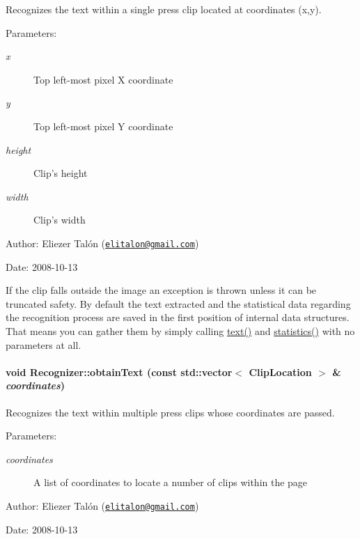 Recognizes the text within a single press clip located at coordinates (x,y). 

\begin{Desc}
\item[Parameters:]
\begin{description}
\item[{\em x}]Top left-most pixel X coordinate \item[{\em y}]Top left-most pixel Y coordinate \item[{\em height}]Clip's height \item[{\em width}]Clip's width\end{description}
\end{Desc}
\begin{Desc}
\item[Author:]Eliezer Talón (\href{mailto:elitalon@gmail.com}{\tt elitalon@gmail.com}) \end{Desc}
\begin{Desc}
\item[Date:]2008-10-13\end{Desc}
If the clip falls outside the image an exception is thrown unless it can be truncated safety. By default the text extracted and the statistical data regarding the recognition process are saved in the first position of internal data structures. That means you can gather them by simply calling \hyperlink{class_recognizer_c5d20b511888a60a6c1a81c0a4206ec2}{text()} and \hyperlink{class_recognizer_8b38356d2741969e67cd6b4f507897ba}{statistics()} with no parameters at all. \hypertarget{class_recognizer_4b3b27b3746edcf831d142eddfb81f19}{
\paragraph[{obtainText}]{\setlength{\rightskip}{0pt plus 5cm}void Recognizer::obtainText (const std::vector$<$ {\bf ClipLocation} $>$ \& {\em coordinates})}\hfill}
\label{class_recognizer_4b3b27b3746edcf831d142eddfb81f19}


Recognizes the text within multiple press clips whose coordinates are passed. 

\begin{Desc}
\item[Parameters:]
\begin{description}
\item[{\em coordinates}]A list of coordinates to locate a number of clips within the page\end{description}
\end{Desc}
\begin{Desc}
\item[Author:]Eliezer Talón (\href{mailto:elitalon@gmail.com}{\tt elitalon@gmail.com}) \end{Desc}
\begin{Desc}
\item[Date:]2008-10-13 \end{Desc}


